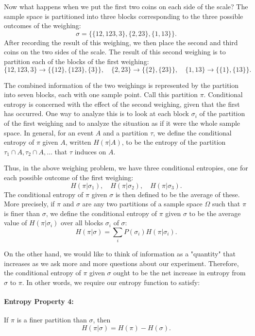 \documentclass{report}
\begin{document}
Now what happens when we put the first two coins on each side of the scale? The sample space is partitioned into three blocks corresponding to the three possible outcomes of the weighing:
\[
\sigma = \{\{12, 123, 3\}, \{2, 23\}, \{1, 13\}\}.
\]
After recording the result of this weighing, we then place the second and third coins on the two sides of the scale. The result of this second weighing is to partition each of the blocks of the first weighing:
\[
\{12, 123, 3\} \to \{\{12\}, \{123\}, \{3\}\}, \quad 
\{2, 23\} \to \{\{2\}, \{23\}\}, \quad 
\{1, 13\} \to \{\{1\}, \{13\}\}.
\]

The combined information of the two weighings is represented by the partition into seven blocks, each with one sample point. Call this partition \( \pi \). Conditional entropy is concerned with the effect of the second weighing, given that the first has occurred. One way to analyze this is to look at each block \( \sigma_i \) of the partition of the first weighing and to analyze the situation as if it were the whole sample space. In general, for an event \( A \) and a partition \( \tau \), we define the conditional entropy of \( \pi \) given \( A \), written \( H(\pi|A) \), to be the entropy of the partition \( \tau_1 \cap A, \tau_2 \cap A, \ldots \) that \( \tau \) induces on \( A \). 

Thus, in the above weighing problem, we have three conditional entropies, one for each possible outcome of the first weighing:
\[
H(\pi|\sigma_1), \quad H(\pi|\sigma_2), \quad H(\pi|\sigma_3).
\]
The conditional entropy of \( \pi \) given \( \sigma \) is then defined to be the average of these. More precisely, if \( \pi \) and \( \sigma \) are any two partitions of a sample space \( \Omega \) such that \( \pi \) is finer than \( \sigma \), we define the conditional entropy of \( \pi \) given \( \sigma \) to be the average value of \( H(\pi|\sigma_i) \) over all blocks \( \sigma_i \) of \( \sigma \):
\[
H(\pi|\sigma) = \sum_i P(\sigma_i) H(\pi|\sigma_i).
\]

On the other hand, we would like to think of information as a "quantity" that increases as we ask more and more questions about our experiment. Therefore, the conditional entropy of \( \pi \) given \( \sigma \) ought to be the net increase in entropy from \( \sigma \) to \( \pi \). In other words, we require our entropy function to satisfy:

\paragraph{Entropy Property 4:} 
If \( \pi \) is a finer partition than \( \sigma \), then
\[
H(\pi|\sigma) = H(\pi) - H(\sigma).
\]
\end{document}
